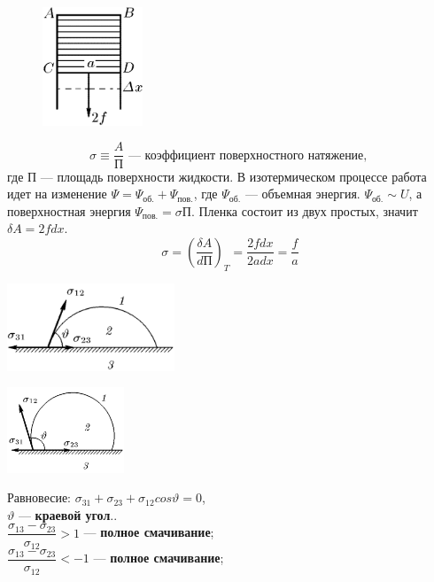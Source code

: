 \begin{figure}
	\includegraphics[width=30mm]{ris23_1.png}
\end{figure}
$$\sigma\equiv\dfrac{A}{\text{П}}\textbf{ --- коэффициент поверхностного натяжение, }$$
где $\text{П}\text{ --- площадь поверхности жидкости.}$ В изотермическом процессе работа идет на изменение $\Psi=\Psi_\text{об.}+\Psi_\text{пов.}$, где $\Psi_\text{об.}$ --- объемная энергия. $\Psi_\text{об.}\sim U$, а поверхностная энергия $\Psi_\text{пов.} =\sigma\text{П}$.
Пленка состоит из двух простых, значит $\delta A=2fdx$.
$$\sigma = \left(\dfrac{\delta A}{d\text{П}}\right)_T=\dfrac{2fdx}{2adx}=\dfrac{f}{a}$$
\begin{minipage}{55mm}
	\includegraphics[width=50mm]{ris23_2.png}\\[-1cm] 
\end{minipage}
\begin{minipage}{40mm}
	\includegraphics[width=35mm]{ris23_3.png} \\[-1cm] 
\end{minipage}
\begin{minipage}{80mm}
	Равновесие: $\sigma_{31}+\sigma_{23}+\sigma_{12}cos\vartheta=0$, \\$\vartheta$ --- \textbf{краевой угол}..\\
	$\dfrac{\sigma_{13}-\sigma_{23}}{\sigma_{12}}>1$ --- \textbf{полное смачивание};\\
	$\dfrac{\sigma_{13}-\sigma_{23}}{\sigma_{12}}<-1$ --- \textbf{полное смачивание};
\end{minipage}

